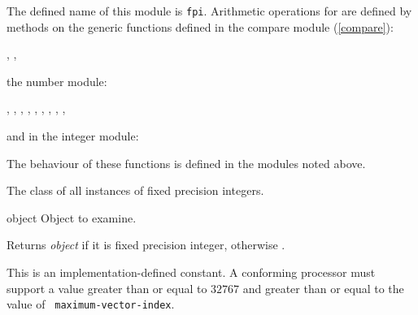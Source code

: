 %
\begin{optDefinition}
The defined name of this module is {\tt fpi}.  Arithmetic operations for
 are defined by methods on the generic
functions defined in the compare module (\ref{compare}):
%
\begin{flushleft}
    ,
    ,
\end{flushleft}
%
\noindent
the number module:
%
\begin{flushleft}
    ,
    ,
    ,
    ,
    ,
    ,
    ,
    ,
    ,
\end{flushleft}

\noindent
and in the integer module:
\begin{flushleft}
\end{flushleft}

\noindent
The behaviour of these functions is defined in the modules noted
above.

%
The class of all instances of fixed precision integers.

\begin{arguments}
\item[object] Object to examine.
\end{arguments}

\result%
Returns {\em object\/} if it is fixed precision integer, otherwise
\nil{}.


\remarks%
This is an implementation-defined constant.  A conforming processor
must support a value greater than or equal to $32767$ and greater than
or equal to the value of {\tt
maximum-vector-index}.


\end{optDefinition}
